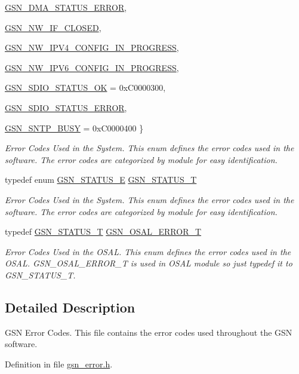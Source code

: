 \begin{DoxyCompactItemize}
\par
\hyperlink{a00659_gga476ae1caf992f8287176b2cc414c8707a434f62dca4f16b8ae560e91a3ce209a4}{GSN\_\-DMA\_\-STATUS\_\-ERROR}, 
\par
\hyperlink{a00659_gga476ae1caf992f8287176b2cc414c8707a5aa7e4499d893c43f068448558ffcac7}{GSN\_\-NW\_\-IF\_\-CLOSED}, 
\par
\hyperlink{a00659_gga476ae1caf992f8287176b2cc414c8707aa43bf552ed9aee790552b1805eb525cd}{GSN\_\-NW\_\-IPV4\_\-CONFIG\_\-IN\_\-PROGRESS}, 
\par
\hyperlink{a00659_gga476ae1caf992f8287176b2cc414c8707ac151d4d3b71542ed8b8c6e218efb47a3}{GSN\_\-NW\_\-IPV6\_\-CONFIG\_\-IN\_\-PROGRESS}, 
\par
\hyperlink{a00659_gga476ae1caf992f8287176b2cc414c8707ad280f6a2f89e50934e488964f06bf1c0}{GSN\_\-SDIO\_\-STATUS\_\-OK} =  0xC0000300, 
\par
\hyperlink{a00659_gga476ae1caf992f8287176b2cc414c8707ad4a9b0b4eda759e9da615ff11aa037e2}{GSN\_\-SDIO\_\-STATUS\_\-ERROR}, 
\par
\hyperlink{a00659_gga476ae1caf992f8287176b2cc414c8707aaff7e73f13814d77b99071d629394f0b}{GSN\_\-SNTP\_\-BUSY} =  0xC0000400
 \}
\begin{DoxyCompactList}\small\item\em Error Codes Used in the System. This enum defines the error codes used in the software. The error codes are categorized by module for easy identification. \end{DoxyCompactList}\item 
typedef enum \hyperlink{a00659_ga476ae1caf992f8287176b2cc414c8707}{GSN\_\-STATUS\_\-E} \hyperlink{a00659_gae36517c0f5872426a7034c9551eb96ac}{GSN\_\-STATUS\_\-T}
\begin{DoxyCompactList}\small\item\em Error Codes Used in the System. This enum defines the error codes used in the software. The error codes are categorized by module for easy identification. \end{DoxyCompactList}\item 
typedef \hyperlink{a00659_gae36517c0f5872426a7034c9551eb96ac}{GSN\_\-STATUS\_\-T} \hyperlink{a00659_ga36216a7aacd1d5024bc7b8bf39c3f46b}{GSN\_\-OSAL\_\-ERROR\_\-T}
\begin{DoxyCompactList}\small\item\em Error Codes Used in the OSAL. This enum defines the error codes used in the OSAL. GSN\_\-OSAL\_\-ERROR\_\-T is used in OSAL module so just typedef it to GSN\_\-STATUS\_\-T. \end{DoxyCompactList}\end{DoxyCompactItemize}


\subsection{Detailed Description}
GSN Error Codes. This file contains the error codes used throughout the GSN software. 

Definition in file \hyperlink{a00493_source}{gsn\_\-error.h}.

